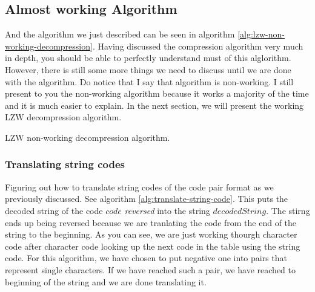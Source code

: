 \begin{refsection}
\subsection{Almost working Algorithm}

And the algorithm we just described can be seen in algorithm
\ref{alg:lzw-non-working-decompression}. Having discussed the
compression algorithm very much in depth, you should be able to
perfectly understand must of this alglorithm. However, there is still
some more things we need to discuss until we are done with the \lzw
algorithm. Do notice that I say that algorithm is non-working. I still
present  to you the non-working algorithm because it works a majority
of the time and it is much easier to explain. In the next section, we
will present the working LZW decompression algorithm.

\begin{algorithm}[H]
  \caption{LZW non-working decompression algorithm.}
  \label{alg:lzw-non-working-decompression}
  \begin{algorithmic}[1]
    \State {}


      \State {}
       

      \State {}


    \EndWhile
  \end{algorithmic}
\end{algorithm}

\subsubsection{Translating string codes}

Figuring out how to translate string codes of the code pair format as we
previously discussed. See algorithm
\ref{alg:translate-string-code}. This puts the decoded string of the
code $code$ \textit{reversed} into the string $decodedString$. The
stirng ends up being reversed because we are tranlating the code from
the end of the string to the beginning. As you can see, we are just
working thourgh character code after character code looking up the
next code in the table using the string code. For this algorithm, we
have chosen to put negative one into pairs that represent single
characters. If we have reached such a pair, we have reached to
beginning of the string and we are done translating it.


\end{refsection}
